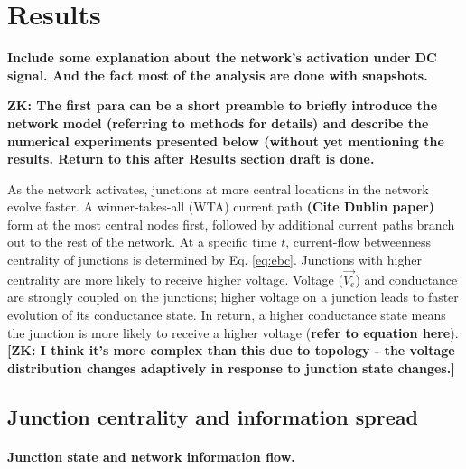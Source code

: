 \documentclass[fleqn,10pt,  reprint, amsmath,amssymb,aps, floatfix]{wlscirep}
\begin{document}
\clearpage
\section*{Results}

\textbf{Include some explanation about the network's activation under DC signal. And the fact most of the analysis are done with snapshots.}


\textbf{ZK: The first para can be a short preamble to briefly introduce the network model (referring to methods for details) and describe the numerical experiments presented below (without yet mentioning the results. Return to this after Results section draft is done.}


As the network activates, junctions at more central locations in the network evolve faster. A winner-takes-all (WTA) current path \textbf{(Cite Dublin paper)} form at the most central nodes first, followed by additional current paths branch out to the rest of the network. At a specific time $t$, current-flow betweenness centrality of junctions is determined by Eq. \ref{eq:ebc}. Junctions with higher centrality are more likely to receive higher voltage. Voltage ($\vec{V_e}$) and conductance are strongly coupled on the junctions; higher voltage on a junction leads to faster evolution of its conductance state.
In return, a higher conductance state means the junction is more likely to receive a higher voltage (\textbf{refer to equation here}).\textbf{[ZK: I think it's more complex than this due to topology - the voltage distribution changes adaptively in response to junction state changes.]}


\subsection*{Junction centrality and information spread}

\paragraph{Junction state and network information flow.}
\end{document}
